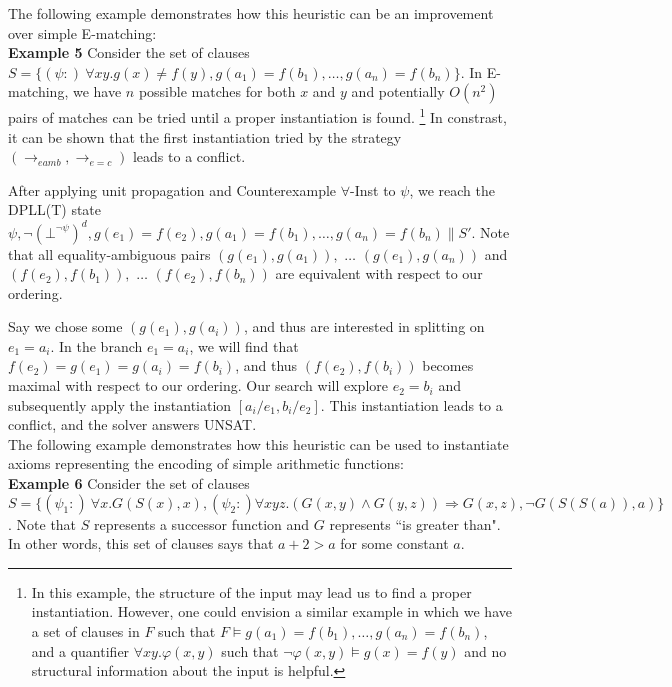\documentclass{llncs}
\begin{document}
The following example demonstrates how this heuristic can be an improvement over simple E-matching: \\

{\bf Example 5}
Consider the set of clauses $S = \{ (\psi :) \ \forall xy. g( x ) \neq f( y ), g( a_1 ) = f( b_1 ), \ldots, g( a_n ) = f( b_n ) \}$.
In E-matching, we have $n$ possible matches for both $x$ and $y$ and potentially $O(n^2)$ pairs of matches can be tried until a proper instantiation is found. 
\footnote{ In this example, the structure of the input may lead us to find a proper instantiation.
However, one could envision a similar example in which we have a set of clauses in $F$ such that $F \models g( a_1 ) = f( b_1 ), \ldots, g( a_n ) = f( b_n )$, and a quantifier $\forall xy. \varphi(x,y)$ such that $\neg \varphi( x, y ) \models g( x ) = f( y )$ and no structural information about the input is helpful. }
In constrast, it can be shown that the first instantiation tried by the strategy $( \rightarrow_{eamb}, \rightarrow_{e=c} )$ leads to a conflict.

After applying unit propagation and Counterexample $\forall$-Inst to $\psi$, we reach the DPLL(T) state $\psi, \neg (\bot^{\neg \psi})^d, g( e_1 ) = f( e_2 ), g( a_1 ) = f( b_1 ), \ldots, g( a_n ) = f( b_n ) \parallel S'$.
Note that all equality-ambiguous pairs $(g( e_1 ), g( a_1 )),$ $\ldots$ $(g( e_1 ), g( a_n ))$ and $(f( e_2 ), f( b_1 )),$ $\ldots$ $(f( e_2 ), f( b_n ))$ are equivalent with respect to our ordering.

Say we chose some $(g( e_1 ), g( a_i ))$, and thus are interested in splitting on $e_1 = a_i$.
In the branch $e_1 = a_i$, we will find that $f( e_2 ) = g( e_1 ) = g( a_i ) = f( b_i )$, and thus $(f( e_2 ), f( b_i ))$ becomes maximal with respect to our ordering.
Our search will explore $e_2 = b_i$ and subsequently apply the instantiation $[ a_i/e_1, b_i/e_2]$. 
This instantiation leads to a conflict, and the solver answers UNSAT.  \\

The following example demonstrates how this heuristic can be used to instantiate axioms representing the encoding of simple arithmetic functions: \\

{\bf Example 6}
Consider the set of clauses $S = \{ (\psi_1 :) \ \forall x. G( S( x ), x), (\psi_2 :) \forall xyz. (G(x,y) \wedge G(y,z)) \Rightarrow G(x,z), \neg G( S(S(a)), a) \}$.
Note that $S$ represents a successor function and $G$ represents ``is greater than".  
In other words, this set of clauses says that $a + 2 > a$ for some constant $a$.
\end{document}
